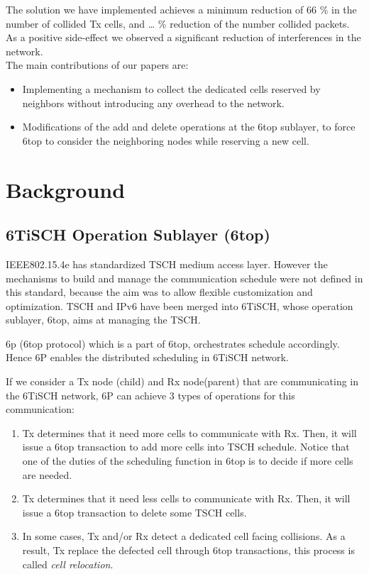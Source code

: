 \documentclass[10pt, conference, compsocconf]{IEEEtran}
\begin{document}
The solution we have implemented achieves a minimum reduction of 66 \% in the number of collided Tx cells, and … \% reduction of the number collided packets. As a positive side-effect we observed a significant reduction of interferences in the network. \\

The main contributions of our papers are:

\begin{itemize}
\item Implementing a mechanism to collect the dedicated cells reserved by neighbors without introducing any overhead to the network. 
\item Modifications of the add and delete operations at the 6top sublayer, to force 6top to consider the neighboring nodes while reserving a new cell.
\end{itemize}

\section{Background}

\subsection{6TiSCH Operation Sublayer (6top)} 

IEEE802.15.4e has standardized TSCH medium access layer. However the mechanisms to build and manage the communication schedule were not defined in this standard, because the aim was to allow flexible customization and optimization. TSCH and IPv6 have been merged into 6TiSCH, whose operation sublayer, 6top, aims at managing the TSCH.

6p (6top protocol) which is a part of 6top, orchestrates schedule accordingly. Hence 6P enables the distributed scheduling in 6TiSCH network.

If we consider a Tx node (child) and Rx node(parent) that are communicating in the 6TiSCH network, 6P can achieve 3 types of operations for this communication: 
\begin{enumerate}

\item Tx determines that it need more cells to communicate with Rx. Then, it  will issue a 6top transaction to add more cells into TSCH schedule. Notice that one of  the duties of the scheduling function in 6top is to decide if more cells are needed.

\item Tx determines that it need less cells to communicate with Rx. Then, it will issue a 6top transaction to delete some TSCH cells. 

\item In some cases, Tx and/or Rx detect a dedicated cell facing collisions. As a result, Tx replace the defected cell through 6top transactions, this process is called {\em cell relocation}.
 
\end{enumerate}
\end{document}
